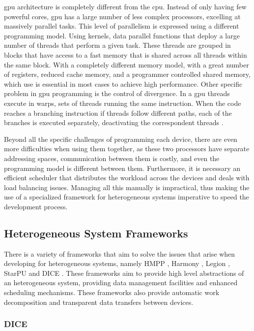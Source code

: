 \gls{gpu} architecture is completely different from the \gls{cpu}. Instead of only having few powerful cores, \gls{gpu} has a large number of less complex processors, excelling at massively parallel tasks. This level of parallelism is expressed using a different programming model. Using kernels, data parallel functions that deploy a large number of threads that perform a given task. These threads are grouped in blocks that have access to a fast memory that is shared across all threads within the same block. With a completely different memory model, with a great number of registers, reduced cache memory, and a programmer controlled shared memory, which use is essential in most cases to achieve high performance. Other specific problem in \gls{gpu} programming is the control of divergence. In a \gls{gpu} threads execute in warps, sets of threads running the same instruction. When the code reaches a branching instruction if threads follow different paths, each of the branches is executed separately, deactivating the correspondent threads \citep{kirk2012programming}.

Beyond all the specific challenges of programming each device, there are even more difficulties when using them together, as these two processors have separate addressing spaces, communication between them is costly, and even the programming model is different between them. Furthermore, it is necessary an efficient scheduler that distributes the workload across the devices and deals with load balancing issues. Managing all this manually is impractical, thus making the use of a specialized framework for heterogeneous systems imperative to speed the development process.

\subsection{Heterogeneous System Frameworks}

There is a variety of frameworks that aim to solve the issues that arise when developing for heterogeneous systems, namely HMPP \citep{dolbeau2007hmpp}, Harmony \citep{diamos2008harmony}, Legion \citep{bauer2012legion}, StarPU \citep{augonnet2011starpu} and DICE \citep{Barbosa}. These frameworks aim to provide high level abstractions of an heterogeneous system, providing data management facilities and enhanced scheduling mechanisms. These frameworks also provide automatic work decomposition and transparent data transfers between devices.

\subsubsection{DICE}


